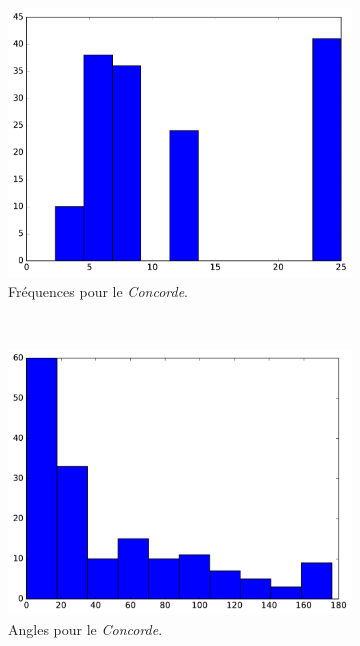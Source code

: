 \begin{figure}[htb]
\begin{subfigure}[t]{\subImgWaStats}
			\includegraphics[width=\textwidth]{figures/ch3/concordeA_frequency}
			\caption{Fréquences pour le \emph{Concorde}.}
			\label{fig:concordeA_frequency}
		\end{subfigure}
		~
		\begin{subfigure}[t]{\subImgWaStats}
			\centering
			\includegraphics[width=\textwidth]{figures/ch3/concordeA_angle}
			\caption{Angles pour le \emph{Concorde}.}
			\label{fig:concordeA_angle}
		\end{subfigure}
		\caption[Histogrammes, enregistrements vidéo de vols d'avions]{}
		\label{fig:histChinaConcorde}
	\end{figure}

